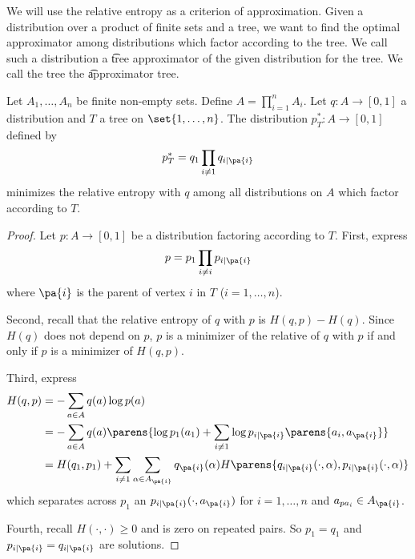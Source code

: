 
We will use the relative entropy as a criterion of approximation.
Given a distribution over a product of finite sets and a tree, we want to find the optimal approximator among distributions which factor according to the tree.
We call such a distribution a \t{tree approximator} of the given distribution for the tree.
We call the tree the \t{approximator tree}.


\begin{prop}

Let $A_1, \dots, A_n$ be finite non-empty sets.
Define $A = \prod_{i = 1}^{n} A_i$.
Let $q: A \to [0, 1]$ a distribution and $T$ a tree on $\set{1, \dots, n}$.
The distribution $p^*_T: A \to [0, 1]$ defined by
$$
  p^*_T = q_1 \prod_{i \neq 1} q_{i \mid \pa{i}}
$$
minimizes the relative entropy with $q$ among all distributions on $A$ which factor according to $T$.

\begin{proof}

Let $p: A \to [0, 1]$ be a distribution factoring according to $T$. First, express
$$
  p = p_1 \prod_{i \neq i} p_{i \mid \pa{i}}
$$
where $\pa{i}$ is the parent of vertex $i$ in $T$ ($i = 1, \dots, n$).

Second, recall that the relative entropy of $q$ with $p$ is $H(q, p) - H(q)$.
Since $H(q)$ does not depend on $p$, $p$ is a minimizer of the relative of $q$ with $p$ if and only if $p$ is a minimizer of $H(q, p)$.

Third, express
$$
\begin{aligned}
  H(q, p) &= - \sum_{a \in A} q(a) \log p(a) \\
          &= - \sum_{a \in A} q(a) \parens{\log p_1(a_1) + \sum_{i \neq 1} \log p_{i \mid \pa{i}}\parens{a_i, a_{\pa{i}}}} \\
          &= H(q_1, p_1) + \sum_{i \neq 1} \sum_{\alpha \in A_{\pa{i}}} q_{\pa{i}}(\alpha)H\parens{q_{i\mid\pa{i}}(\cdot, \alpha), p_{i\mid\pa{i}}(\cdot, \alpha)}
\end{aligned}
$$
  which separates across $p_1$ an $p_{i \mid \pa{i}}(\cdot, a_{\pa{i}})$ for $i = 1, \dots, n$ and $a_{pa_{i}} \in A_{\pa{i}}$.

Fourth, recall $H(\cdot, \cdot) \geq 0$ and is zero on repeated pairs.
So $p_1 = q_1$ and $p_{i \mid \pa{i}} = q_{i \mid \pa{i}}$ are solutions.

\end{proof}

\end{prop}

%
\strats
